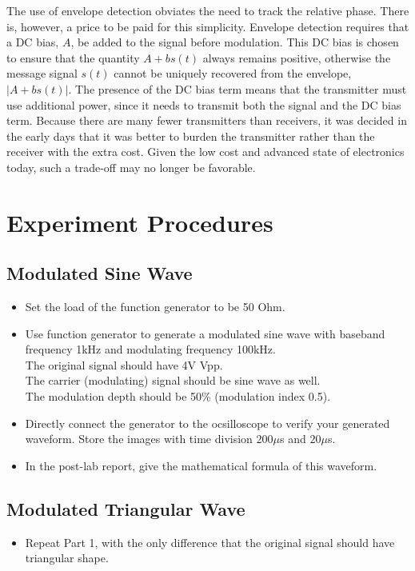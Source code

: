 \documentclass[a4paper]{article}
\begin{document}
The use of envelope detection obviates the need to track the relative phase. There is, however, a price to be paid for this simplicity. Envelope detection requires that a DC bias, $A$, be added to the signal before modulation. This DC bias is chosen to ensure that the quantity $A+bs(t)$ always remains positive, otherwise the message signal $s(t)$ cannot be uniquely recovered from the envelope, $|A+bs(t)|$. The presence of the DC bias term means that the transmitter must use additional power, since it needs to transmit both the signal and the DC bias term. Because there are many fewer transmitters than receivers, it was decided in the early days that it was better to burden the transmitter rather than the receiver with the extra cost. Given the low cost and advanced state of electronics today, such a trade-off may no longer be favorable.
\section{Experiment Procedures}
\subsection{Modulated Sine Wave}
\begin{itemize}
	\item Set the load of the function generator to be 50 Ohm.
	\item Use function generator to generate a modulated sine wave with baseband frequency 1kHz and modulating frequency 100kHz.\\
	The original signal should have 4V Vpp.\\
	The carrier (modulating) signal should be sine wave as well.\\
	The modulation depth should be 50\% (modulation index 0.5).
	\item Directly connect the generator to the ocsilloscope to verify your generated waveform. Store the images with time division $200\mu$s and $20\mu$s.
	\item In the post-lab report, give the mathematical formula of this waveform.
\end{itemize}
\subsection{Modulated Triangular Wave}
\begin{itemize}
	\item Repeat Part 1, with the only difference that the original signal should have triangular shape.
\end{itemize}
\end{document}
